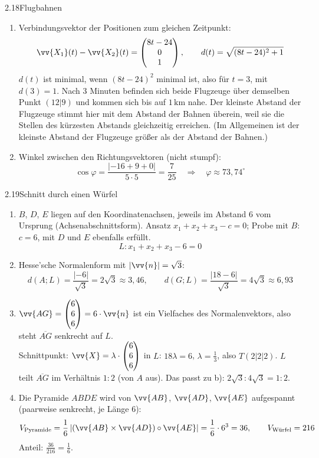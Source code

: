 \begin{loesung}{2.18}{Flugbahnen}
\begin{enumerate}[label=\alph*)]
  \item Verbindungsvektor der Positionen zum gleichen Zeitpunkt:
  \[\vv{X_1}(t)-\vv{X_2}(t) = \begin{pmatrix} 8t-24\\ 0\\ 1\end{pmatrix},\qquad d(t) = \sqrt{(8t-24)^2+1}\]
  $d(t)$ ist minimal, wenn $(8t-24)^2$ minimal ist, also für $t=3$, mit $d(3) = 1$. Nach $3$ Minuten befinden sich beide Flugzeuge über demselben Punkt $(12|9)$ und kommen sich bis auf $1\,\text{km}$ nahe. Der kleinste Abstand der Flugzeuge stimmt hier mit dem Abstand der Bahnen überein, weil sie die Stellen des kürzesten Abstands gleichzeitig erreichen. (Im Allgemeinen ist der kleinste Abstand der Flugzeuge größer als der Abstand der Bahnen.)
  \item Winkel zwischen den Richtungsvektoren (nicht stumpf):
  \[\cos{\varphi} = \dfrac{|-16+9+0|}{5\cdot 5} = \dfrac{7}{25}\quad\Longrightarrow\quad\varphi\approx 73{,}74^{\circ}\]
\end{enumerate}
\end{loesung}

\begin{loesung}{2.19}{Schnitt durch einen Würfel}
\begin{enumerate}[label=\alph*)]
  \item $B$, $D$, $E$ liegen auf den Koordinatenachsen, jeweils im Abstand $6$ vom Ursprung (Achsenabschnittsform). Ansatz $x_1+x_2+x_3-c=0$; Probe mit $B$: $c=6$, mit $D$ und $E$ ebenfalls erfüllt.
  \[L: x_1+x_2+x_3-6 = 0\]
  \item Hesse'sche Normalenform mit $|\vv{n}| = \sqrt{3}$:
  \[d(A;L) = \dfrac{|-6|}{\sqrt{3}} = 2\sqrt{3}\approx 3{,}46,\qquad d(G;L) = \dfrac{|18-6|}{\sqrt{3}} = 4\sqrt{3}\approx 6{,}93\]
  \item $\vv{AG} = \begin{pmatrix} 6\\ 6\\ 6\end{pmatrix} = 6\cdot\vv{n}$ ist ein Vielfaches des Normalenvektors, also steht $\overline{AG}$ senkrecht auf $L$.\\
  Schnittpunkt: $\vv{X} = \lambda\cdot\begin{pmatrix} 6\\ 6\\ 6\end{pmatrix}$ in $L$: $18\lambda = 6$, $\lambda = \frac{1}{3}$, also $T(2|2|2)$. $L$ teilt $\overline{AG}$ im Verhältnis $1:2$ (von $A$ aus). Das passt zu b): $2\sqrt{3}:4\sqrt{3} = 1:2$.
  \item Die Pyramide $ABDE$ wird von $\vv{AB}$, $\vv{AD}$, $\vv{AE}$ aufgespannt (paarweise senkrecht, je Länge $6$):
  \[V_{\text{Pyramide}} = \dfrac{1}{6}\left|(\vv{AB}\times\vv{AD})\circ\vv{AE}\right| = \dfrac{1}{6}\cdot 6^3 = 36,\qquad V_{\text{Würfel}} = 216\]
  Anteil: $\frac{36}{216} = \frac{1}{6}$.
\end{enumerate}
\end{loesung}

